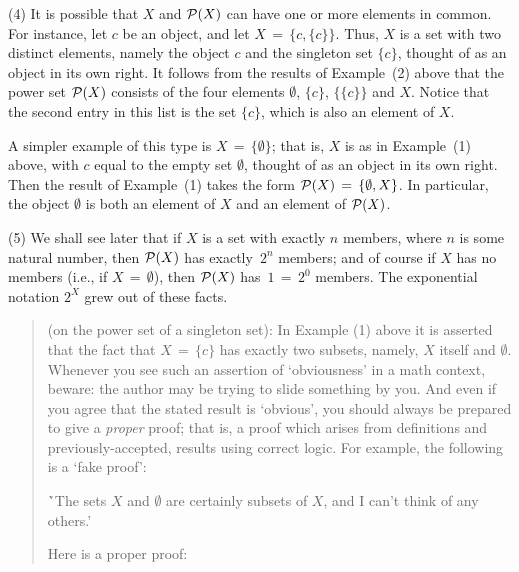 {\V

        (4) It is possible that $X$ and ${\cal P}(X)$ can have one or more elements in common.
    For instance, let $c$ be an object, and let $X \,=\, \{c,\{c\}\}$.
    Thus, $X$ is a set with two distinct elements, namely the object $c$ and the singleton set $\{c\}$, thought of as an object in its own right.
    It follows from the results of Example~(2) above that the power set ${\cal P}(X)$ consists of the four elements ${\emptyset}$, $\{c\}$, $\{\{c\}\}$ and $X$.
    Notice that the second entry in this list is the set $\{c\}$, which is also an element of $X$.

        A simpler example of this type is $X \,=\, \{{\emptyset}\}$;
    that is, $X$ is as in Example~(1) above, with $c$ equal to the empty set ${\emptyset}$, thought of as an object in its own right.
    Then the result of Example~(1) takes the form ${\cal P}(X) \,=\, \{{\emptyset},X\}$.
    In particular, the object ${\emptyset}$ is both an element of $X$ and an element of ${\cal P}(X)$.

\V

        (5) We shall see later that if $X$ is a set with exactly $n$ members, where $n$ is some natural number,
    then ${\cal P}(X)$ has exactly~$2^{n}$ members; and of course if $X$ has no members (i.e., if $X \,=\, {\emptyset}$),
    then ${\cal P}(X)$ has~$1 \,=\, 2^{0}$ members. The exponential notation $2^{X}$ grew out of these facts.

\V

\begin{quotation}
{\footnotesize \underline{\Note} (on the power set of a singleton set): 
    In Example (1) above it is asserted that the fact that $X \,=\, \{c\}$ has exactly two subsets, namely, $X$ itself and ${\emptyset}$.
    Whenever you see such an assertion of `obviousness' in a math context, beware:
    the author may be trying to slide something by you. And even if you agree that the stated result is `obvious',
    you should always be prepared to give a {\em proper} proof; that is, a proof which arises from definitions and previously-accepted, results using correct logic.
    For example, the following is a `fake proof':

\VA

        \h `The sets $X$ and ${\emptyset}$ are certainly subsets of $X$, and I can't think of any others.'

\VA

\noindent Here is a proper proof:

}
\end{quotation}}
